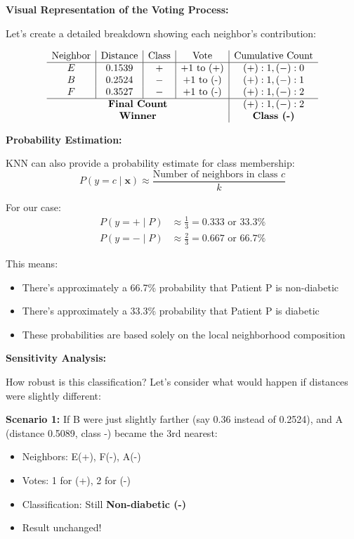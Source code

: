 \documentclass[12pt]{article}
\begin{document}
\begin{computation}
\textbf{Visual Representation of the Voting Process:}

Let's create a detailed breakdown showing each neighbor's contribution:

\[
\begin{array}{c|c|c|c|c}
\text{Neighbor} & \text{Distance} & \text{Class} & \text{Vote} & \text{Cumulative Count} \\
\hline
E & 0.1539 & + & +1 \text{ to (+)} & (+): 1, (-): 0 \\
B & 0.2524 & - & +1 \text{ to (-)} & (+): 1, (-): 1 \\
F & 0.3527 & - & +1 \text{ to (-)} & (+): 1, (-): 2 \\
\hline
\multicolumn{4}{c|}{\textbf{Final Count}} & (+): 1, (-): 2 \\
\multicolumn{4}{c|}{\textbf{Winner}} & \textbf{Class (-)} \\
\end{array}
\]

\textbf{Probability Estimation:}

KNN can also provide a probability estimate for class membership:
\[
P(y = c \mid \mathbf{x}) \approx \frac{\text{Number of neighbors in class } c}{k}
\]

For our case:
\begin{align*}
P(y = + \mid P) &\approx \frac{1}{3} = 0.333 \text{ or } 33.3\% \\
P(y = - \mid P) &\approx \frac{2}{3} = 0.667 \text{ or } 66.7\%
\end{align*}

This means:
\begin{itemize}
    \item There's approximately a 66.7\% probability that Patient P is non-diabetic
    \item There's approximately a 33.3\% probability that Patient P is diabetic
    \item These probabilities are based solely on the local neighborhood composition
\end{itemize}

\textbf{Sensitivity Analysis:}

How robust is this classification? Let's consider what would happen if distances were slightly different:

\textbf{Scenario 1:} If B were just slightly farther (say 0.36 instead of 0.2524), and A (distance 0.5089, class -) became the 3rd nearest:
\begin{itemize}
    \item Neighbors: E(+), F(-), A(-)
    \item Votes: 1 for (+), 2 for (-)
    \item Classification: Still \textbf{Non-diabetic (-)}
    \item Result unchanged!
\end{itemize}


\end{computation}
\end{document}
